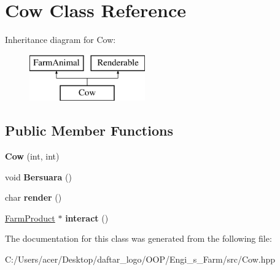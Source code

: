 \hypertarget{class_cow}{}\section{Cow Class Reference}
\label{class_cow}
Inheritance diagram for Cow\+:\begin{figure}[H]
\begin{center}
\leavevmode
\includegraphics[height=2.000000cm]{class_cow}
\end{center}
\end{figure}
\subsection*{Public Member Functions}
\begin{DoxyCompactItemize}
\item 
\mbox{\label{class_cow_a55a5b390a19207454d6f22dd62cad6e4}} 
{\bfseries Cow} (int, int)
\item 
\mbox{\label{class_cow_a4429fc0e583d8f5f937aa280247d3d6d}} 
void {\bfseries Bersuara} ()
\item 
\mbox{\label{class_cow_a3d1e7ab6e78229968e177705d06667b8}} 
char {\bfseries render} ()
\item 
\mbox{\label{class_cow_acc9b36d40b3908750d28578bd0688c01}} 
\mbox{\hyperlink{class_farm_product}{Farm\+Product}} $\ast$ {\bfseries interact} ()
\end{DoxyCompactItemize}


The documentation for this class was generated from the following file\+:\begin{DoxyCompactItemize}
\item 
C\+:/\+Users/acer/\+Desktop/daftar\+\_\+logo/\+O\+O\+P/\+Engi\+\_\+s\+\_\+\+Farm/src/Cow.\+hpp\end{DoxyCompactItemize}
